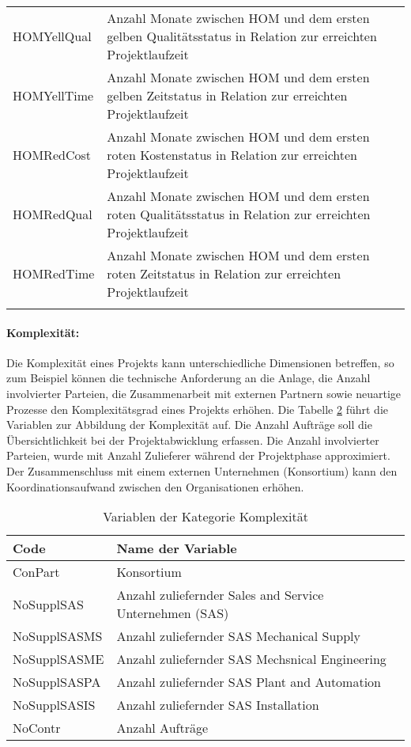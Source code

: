 \begin{longtable}[ht]{p{}p{}}
		HOMYellQual & Anzahl Monate zwischen HOM und dem ersten gelben Qualitätsstatus in Relation zur erreichten Projektlaufzeit \\
		HOMYellTime & Anzahl Monate zwischen HOM und dem ersten gelben Zeitstatus in Relation zur erreichten Projektlaufzeit \\
		HOMRedCost & Anzahl Monate zwischen HOM und dem ersten roten Kostenstatus in Relation zur erreichten Projektlaufzeit \\
		HOMRedQual & Anzahl Monate zwischen HOM und dem ersten roten Qualitätsstatus in Relation zur erreichten Projektlaufzeit \\
		HOMRedTime & Anzahl Monate zwischen HOM und dem ersten roten Zeitstatus in Relation zur erreichten Projektlaufzeit \\
		\bottomrule
	\label{tab:ffvar}%
\end{longtable}%
\paragraph{Komplexität:} Die Komplexität eines Projekts kann unterschiedliche Dimensionen betreffen, so zum Beispiel können die technische Anforderung an die Anlage, die Anzahl involvierter Parteien, die Zusammenarbeit mit externen Partnern sowie neuartige Prozesse den Komplexitätsgrad eines Projekts erhöhen. Die Tabelle \ref{tab:covar} führt die Variablen zur Abbildung der Komplexität auf. Die Anzahl Aufträge soll die Übersichtlichkeit bei der Projektabwicklung erfassen. Die Anzahl involvierter Parteien, wurde mit Anzahl Zulieferer während der Projektphase approximiert. Der Zusammenschluss mit einem externen Unternehmen (Konsortium) kann den Koordinationsaufwand zwischen den Organisationen erhöhen.
\begin{table}[H]
	\centering
	\caption{Variablen der Kategorie Komplexität}
	\begin{tabular}{ll}
			\toprule
		\textbf{Code} & \textbf{Name der Variable} \\ \midrule
		ConPart & Konsortium \\
		NoSupplSAS & Anzahl zuliefernder Sales and Service Unternehmen (SAS) \\
		NoSupplSASMS & Anzahl zuliefernder SAS Mechanical Supply \\
		NoSupplSASME & Anzahl zuliefernder SAS Mechsnical Engineering \\
		NoSupplSASPA & Anzahl zuliefernder SAS Plant and Automation \\
		NoSupplSASIS & Anzahl zuliefernder SAS Installation \\
		NoContr & Anzahl Aufträge \\ 
		\bottomrule
	\end{tabular}%
	\label{tab:covar}%
\end{table}%
